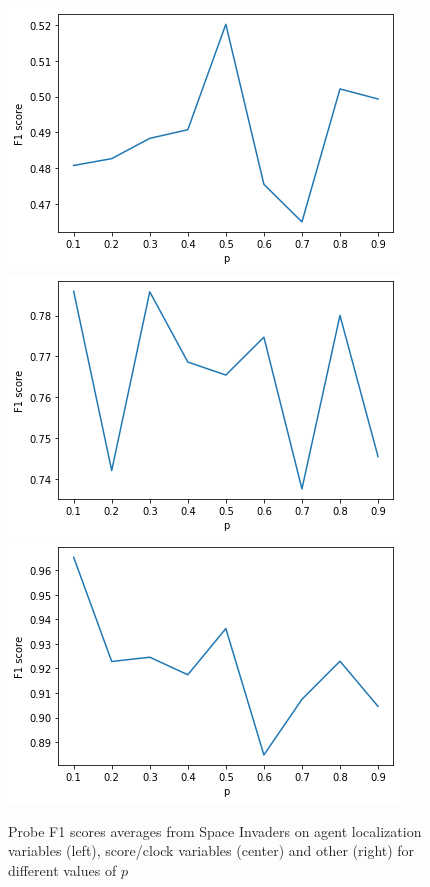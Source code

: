\begin{figure}[H]
    \centering
    \includegraphics[scale=0.38]{../openreview/ablation2-agent_avg_f1.png}
    \includegraphics[scale=0.38]{../openreview/ablation2-score_avg_f1.png}
    \includegraphics[scale=0.38]{../openreview/ablation2-other_avg_f1.png}
    \caption{Probe F1 scores averages from Space Invaders on agent localization variables (left), score/clock variables (center) and other (right) for different values of $p$}
    \label{fig:ablation2-avg}
\end{figure}

